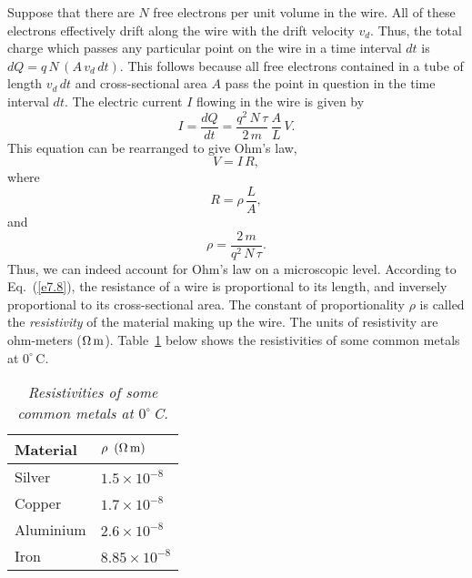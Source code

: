 Suppose that there are $N$ free electrons per unit volume in the wire. All
of these electrons effectively drift along the wire with the drift velocity $v_d$. 
Thus, the total charge which passes any particular point on the wire in
a time interval $dt$ is $dQ = q\,N\,(A\,v_d\,dt)$.
This follows because all free electrons contained in a tube of
length $v_d\,dt$ and cross-sectional area $A$ pass the point in
question in the time interval $dt$. 
The electric current $I$ flowing in the wire is given by
\begin{equation}
I= \frac{dQ}{d t} = \frac{q^2\,N\,\tau}{2\,m} \,\frac{A}{L} \,V.
\end{equation}
This equation can be rearranged to give Ohm's law,
\begin{equation}
V= I\,R,
\end{equation}
where
\begin{equation}\label{e7.8}
R = \rho\,\frac{L}{A},
\end{equation}
and
\begin{equation}
\rho = \frac{2\,m}{q^2\,N\,\tau}.
\end{equation}
Thus, we can indeed account for Ohm's law on a microscopic level. 
According to Eq.~(\ref{e7.8}), the resistance of a wire is proportional
to its length, and inversely proportional to its cross-sectional area.
The constant of proportionality  $\rho$ is called the {\em resistivity}\/ of the material making
up the wire. The units of resistivity are ohm-meters ($\Omega\,{\rm m}$). Table~\ref{t7.1}
below shows the resistivities of some common metals at $0^\circ$\,C.

\begin{table}\centering
\begin{tabular}{l l}\hline
Material & $\rho \,\,\,(\Omega\,{\rm m})$\\ \hline
Silver & $1.5\times 10^{-8}$\\
Copper & $1.7\times 10^{-8} $\\
Aluminium & $2.6\times 10^{-8} $\\
Iron & $8.85\times 10^{-8}$\\\hline
\end{tabular}
\caption{\em Resistivities of some common metals at $0^\circ$\,C.}\label{t7.1}
\end{table}

